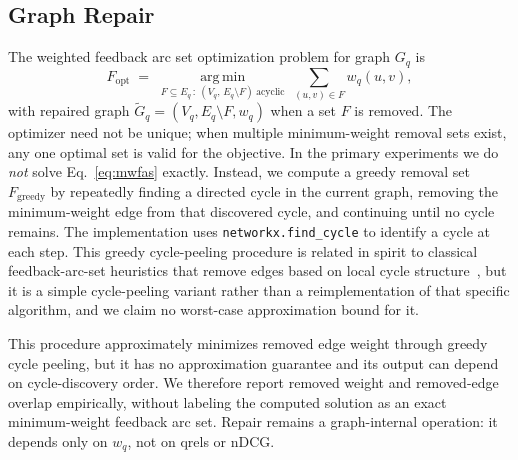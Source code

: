 \documentclass[manuscript,anonymous,review]{acmart}
\begin{document}
\subsection{Graph Repair}
\label{sec:repair}

The weighted feedback arc set optimization problem for graph $G_q$ is
\begin{equation}
  F_{\mathrm{opt}} \;=\; \operatorname*{arg\,min}_{F \subseteq E_q \,:\ (V_q,\, E_q\setminus F)\ \text{acyclic}} \ \sum_{(u,v)\in F} w_q(u,v),
  \label{eq:mwfas}
\end{equation}
with repaired graph $\widetilde G_q = (V_q, E_q \setminus F, w_q)$ when a set
$F$ is removed. The optimizer need not be unique; when multiple minimum-weight
removal sets exist, any one optimal set is valid for the objective. In the
primary experiments we do \emph{not} solve Eq.~\eqref{eq:mwfas} exactly.
Instead, we compute a greedy removal set $F_{\mathrm{greedy}}$ by repeatedly
finding a directed cycle in the current graph, removing the minimum-weight edge
from that discovered cycle, and continuing until no cycle remains. The
implementation uses \texttt{networkx.find\_cycle} to identify a cycle at each
step. This greedy cycle-peeling procedure is related in spirit to classical
feedback-arc-set heuristics that remove edges based on local cycle
structure~\cite{eades1993heuristic}, but it is a simple cycle-peeling variant
rather than a reimplementation of that specific algorithm, and we claim no
worst-case approximation bound for it.

This procedure approximately minimizes removed edge weight through greedy cycle
peeling, but it has no approximation guarantee and its output can depend on
cycle-discovery order. We therefore report removed weight and removed-edge
overlap empirically, without labeling the computed solution as an exact
minimum-weight feedback arc set. Repair remains a graph-internal operation: it
depends only on $w_q$, not on qrels or nDCG.
\end{document}
